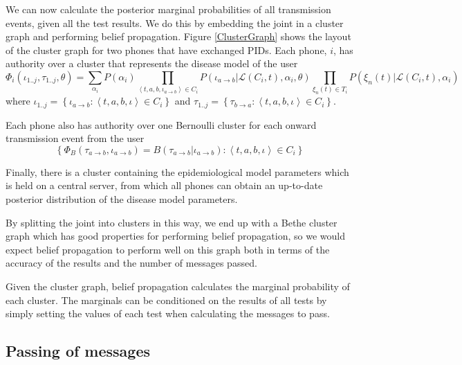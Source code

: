 \documentclass{article}
\begin{document}
We can now calculate the posterior marginal probabilities of all transmission events, given all the test results. We do this by embedding the joint in a cluster graph and performing belief propagation\cite{pearl2014probabilistic}\cite{koller2009probabilistic}. Figure \ref{ClusterGraph} shows the layout of the cluster graph for two phones that have exchanged PIDs. Each phone, $i$, has authority over a cluster that represents the disease model of the user
\begin{equation}
\Phi_i(\iota_{1..j},\tau_{1..j}, \theta) =
\sum_{\alpha_i}P(\alpha_i)
\prod_{\left< t,a,b, \iota_{a\rightarrow b} \right> \in C_i}
P\left(\iota_{a\rightarrow b}|\mathcal{L}(C_i,t),\alpha_i, \theta \right)
\prod_{\xi_{n}(t) \in T_i}
P(\xi_{n}(t)|\mathcal{L}(C_i,t),\alpha_i)
\label{ijoint}
\end{equation}
where $\iota_{1..j} = \left\{\iota_{a\rightarrow b}:\left< t,a,b, \iota \right> \in C_i\right\}$ and $\tau_{1..j} = \left\{\tau_{b\rightarrow a}:\left< t,a,b, \iota \right> \in C_i\right\}$.

Each phone also has authority over one Bernoulli cluster for each onward transmission event from the user
\begin{equation}
\left\{ \Phi_{B}(\tau_{a\rightarrow b},\iota_{a\rightarrow b}) = B(\tau_{a\rightarrow b}|\iota_{a\rightarrow b}) : \left<t,a,b,\iota\right> \in C_i \right\}
\end{equation}
 
Finally, there is a cluster containing the epidemiological model parameters which is held on a central server, from which all phones can obtain an up-to-date posterior distribution of the disease model parameters.

By splitting the joint into clusters in this way, we end up with a Bethe cluster graph which has good properties for performing belief propagation\cite{koller2009probabilistic}, so we would expect belief propagation to perform well on this graph both in terms of the accuracy of the results and the number of messages passed.

Given the cluster graph, belief propagation calculates the marginal probability of each cluster. The marginals can be conditioned on the results of all tests by simply setting the values of each test when calculating the messages to pass.

\subsection{Passing of messages}
\end{document}
